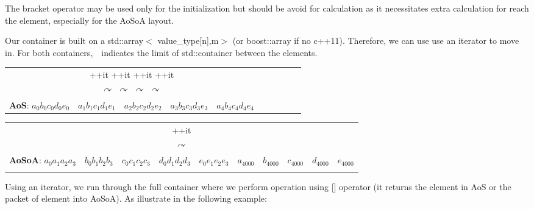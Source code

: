 \documentclass[11pt]{amsart}
\begin{document}
The bracket operator may be used only for the initialization but should be avoid for calculation as it necessitates extra calculation for reach the element, especially for the AoSoA layout. 

Our container is built on a std::array$<$ value\_type[n],m$>$ (or boost::array if no c++11). Therefore, we can use use an iterator to move in. For both containers, \textbar \,\, indicates 
the limit of std::container between the elements.

\begin{center}
\tiny{
\begin{tabular}{ c | c  | c  | c  | c  c c c c c}
                           \multicolumn{5}{c}{  \hspace{0.7cm} ++it \hspace{1cm}   ++it   \hspace{1cm}    ++it   \hspace{1cm}    ++it } &&&&& \\  
                           \multicolumn{5}{c}{  \hspace{0.6cm} $\curvearrowright$ \hspace{1.3cm}  $\curvearrowright$  \hspace{1.2cm}   $\curvearrowright$  \hspace{1.2cm}   $\curvearrowright$} &&&&& \\  
 \textbf{AoS}:  $a_0 b_0 c_0 d_0 e_0$ &  $a_1 b_1 c_1 d_1 e_1$ & $a_2 b_2 c_2 d_2 e_2$ & $a_3 b_3 c_3 d_3 e_3$ & $a_4 b_4 c_4 d_4 e_4$ &&&&& \\
\end{tabular}}
\end{center}
\vspace{0.2cm}
\begin{center}
\tiny{
\begin{tabular}{ c  c   c   c   c |  c c c c c}
  \multicolumn{10}{c}{  \hspace{3.1cm}  ++it } \\ 
  \multicolumn{10}{c}{  \hspace{3.1cm}  $\curvearrowright$ } \\
 \textbf{AoSoA}:  $a_0a_1 a_2 a_3$ &  $b_0 b_1 b_2 b_3$ & $c_0 c_1 c_2 c_3$ &  $d_0d_1 d_2 d_3$ & $e_0e_1 e_2 e_3$   &$a_4000$ &   $b_4000$ &  $c_4000$ &  $d_4000$ &  $e_4000$  \\
\\
\end{tabular}}
\end{center}

Using an iterator, we run through the full container where we perform operation using [] operator (it returns the element in AoS or the packet of element into AoSoA). As illustrate in the following example: \\
\end{document}
